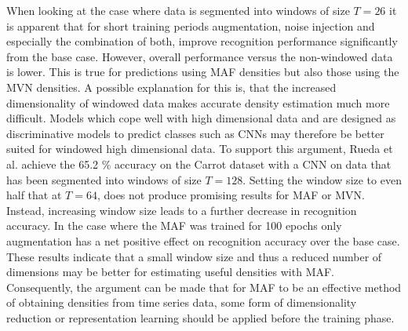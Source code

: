 \documentclass[11pt,titlepage,oneside,openany]{book}
\begin{document}
\noindent When looking at the case where data is segmented into windows of size $T=26$ it is apparent that for short training periods augmentation, noise injection and especially the combination of both, improve recognition performance significantly from the base case. However, overall performance versus the non-windowed data is lower. This is true for predictions using MAF densities but also those using the MVN densities. A possible explanation for this is, that the increased dimensionality of windowed data makes accurate density estimation much more difficult. Models which cope well with high dimensional data and are designed as discriminative models to predict classes such as CNNs may therefore be better suited for windowed high dimensional data. To support this argument, Rueda et al. \cite{rueda_combining_2019} achieve the 65.2 \% accuracy on the Carrot dataset with a CNN on data that has been segmented into windows of size $T=128$. Setting the window size to even half that at $T=64$, does not produce promising results for MAF or MVN. Instead, increasing window size leads to a further decrease in recognition accuracy. In the case where the MAF was trained for 100 epochs only augmentation has a net positive effect on recognition accuracy over the base case. These results indicate that a small window size and thus a reduced number of dimensions may be better for estimating useful densities with MAF. Consequently, the argument can be made that for MAF to be an effective method of obtaining densities from time series data, some form of dimensionality reduction or representation learning should be applied before the training phase.
\end{document}
